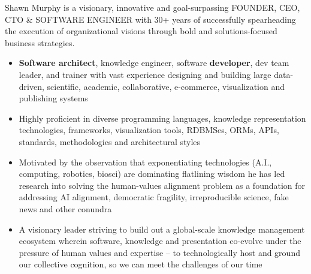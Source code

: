 \begin{par}
  Shawn Murphy is a visionary, innovative and goal-surpassing
  FOUNDER, CEO, CTO \& SOFTWARE ENGINEER with 30+ years of successfully spearheading
  the execution of organizational visions through bold and solutions-focused
  business strategies.
  \begin{itemize}
  \item \textbf{Software architect}, knowledge engineer,
    software \textbf{developer}, dev team leader,
    and trainer with vast experience designing and building large
    data-driven, scientific, academic, collaborative, e-commerce,
    visualization and publishing systems
  \item Highly proficient in diverse programming languages, knowledge
    representation technologies, frameworks, visualization tools, RDBMSes,
    ORMs, APIs, standards, methodologies and architectural styles
  \item Motivated by the observation that exponentiating technologies
    (A.I., computing, robotics, biosci) are dominating flatlining
    wisdom he has led research into solving the human-values
    alignment problem as a foundation for addressing AI alignment,
    democratic fragility, irreproducible science, fake news and other conundra
  \item A visionary leader striving to build out a global-scale
    knowledge management ecosystem wherein software, knowledge and
    presentation co-evolve under the pressure of human values and
    expertise -- to technologically host and ground our collective
    cognition, so we can meet the challenges of our time
  \end{itemize}

\begin{comment}
Examples of his work include:
  a vehicle fleet tracking system with RESTful API;
  multiple dynamic knowledge visualization systems;
  a custom database publishing system used by the largest real estate
    markets in Western Canada;
  real-estate systems powered by his own RETS implementation;
  a large bibliographic collaboration system seeded with Library of Congress data;
  a Laboratory Information Management System for disease diagnosis which
    captured, processed and reported on disparate scientific data streams;
  recruiting management systems;
  numerous B2B and B2C e-commerce technologies and systems
    (handling both digital and tangible goods);
  and many other projects involving sophisticated data-sets and processing.
\end{comment}

\end{par}

